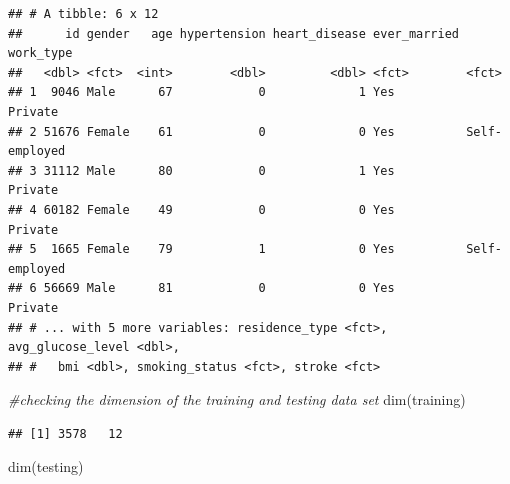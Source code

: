 \documentclass[
]{article}
\newenvironment{Shaded}{\begin{snugshade}}{\end{snugshade}}
\newcommand{\AttributeTok}[1]{\textcolor[rgb]{0.77,0.63,0.00}{#1}}
\newcommand{\CommentTok}[1]{\textcolor[rgb]{0.56,0.35,0.01}{\textit{#1}}}
\newcommand{\ConstantTok}[1]{\textcolor[rgb]{0.00,0.00,0.00}{#1}}
\newcommand{\DecValTok}[1]{\textcolor[rgb]{0.00,0.00,0.81}{#1}}
\newcommand{\FloatTok}[1]{\textcolor[rgb]{0.00,0.00,0.81}{#1}}
\newcommand{\FunctionTok}[1]{\textcolor[rgb]{0.00,0.00,0.00}{#1}}
\newcommand{\NormalTok}[1]{#1}
\newcommand{\OtherTok}[1]{\textcolor[rgb]{0.56,0.35,0.01}{#1}}
\newcommand{\SpecialCharTok}[1]{\textcolor[rgb]{0.00,0.00,0.00}{#1}}
\renewcommand{\=}[1]{\stackrel{#1}{=}}
\theoremstyle{definition}
\theoremstyle{remark}
\begin{document}
\begin{verbatim}
## # A tibble: 6 x 12
##      id gender   age hypertension heart_disease ever_married work_type    
##   <dbl> <fct>  <int>        <dbl>         <dbl> <fct>        <fct>        
## 1  9046 Male      67            0             1 Yes          Private      
## 2 51676 Female    61            0             0 Yes          Self-employed
## 3 31112 Male      80            0             1 Yes          Private      
## 4 60182 Female    49            0             0 Yes          Private      
## 5  1665 Female    79            1             0 Yes          Self-employed
## 6 56669 Male      81            0             0 Yes          Private      
## # ... with 5 more variables: residence_type <fct>, avg_glucose_level <dbl>,
## #   bmi <dbl>, smoking_status <fct>, stroke <fct>
\end{verbatim}

\begin{Shaded}
\end{Shaded}

\begin{Shaded}
\begin{Highlighting}[]
\CommentTok{\#checking the dimension of the training and testing data set}
\FunctionTok{dim}\NormalTok{(training)}
\end{Highlighting}
\end{Shaded}

\begin{verbatim}
## [1] 3578   12
\end{verbatim}

\begin{Shaded}
\begin{Highlighting}[]
\FunctionTok{dim}\NormalTok{(testing)}
\end{Highlighting}
\end{Shaded}
\end{document}
